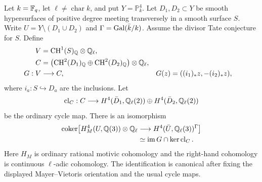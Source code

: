 \begin{proposition}
\label{prop:B-fixed-open-ramification-obstruction}
Let \(k=\mathbb F_q\), let \(\ell\ne\operatorname{char}k\), and put
\(Y=\mathbb P^4_k\).  Let \(D_1,D_2\subset Y\) be smooth
hypersurfaces of positive degree meeting transversely in a smooth
surface \(S\).  Write \(U=Y\setminus(D_1\cup D_2)\) and
\(\Gamma=\operatorname{Gal}(\bar k/k)\).  Assume the divisor Tate conjecture
for \(S\).  Define
\[
\begin{aligned}
 V&=\operatorname{CH}^1(S)_\mathbb Q\otimes\mathbb Q_\ell,\\
 C&=\bigl(\operatorname{CH}^2(D_1)_\mathbb Q
             \oplus\operatorname{CH}^2(D_2)_\mathbb Q\bigr)
                 \otimes\mathbb Q_\ell,\\
 G:V&\longrightarrow C,
       &G(z)&=((i_1)_*z,-(i_2)_*z),
\end{aligned}
\]
where \(i_a:S\hookrightarrow D_a\) are the inclusions.  Let
\[
 \operatorname{cl}_C:C\longrightarrow
 H^4(\bar D_1,\mathbb Q_\ell(2))\oplus H^4(\bar D_2,\mathbb Q_\ell(2))
\]
be the ordinary cycle map.  There is an isomorphism
\[
\begin{split}
 \operatorname{coker}\bigl[
   H_M^4(U,\mathbb Q(3))\otimes\mathbb Q_\ell
       &\longrightarrow H^4(\bar U,\mathbb Q_\ell(3))^\Gamma
                         \bigr]\\
       &\simeq\operatorname{im}G\cap\ker\operatorname{cl}_C.
\end{split}
\]
Here \(H_M\) is ordinary rational motivic cohomology and the
right-hand cohomology is continuous \(\ell\)-adic cohomology.
The identification is canonical after fixing the displayed
Mayer--Vietoris orientation and the usual cycle maps.
\end{proposition}
